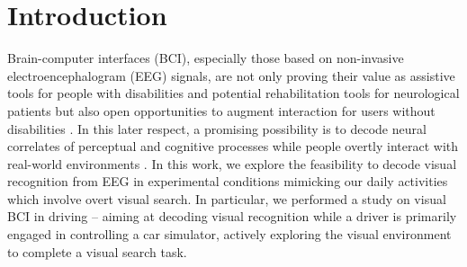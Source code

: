 \documentclass[12pt]{iopart}
\begin{document}

\section{Introduction}
\label{sec:intro}


Brain-computer interfaces (BCI), especially those based on 
non-invasive electroencephalogram (EEG) signals, are not only
proving their value as assistive tools for people 
with disabilities
\cite{birbaumer_spelling_1999,wolpaw_control_2004,holz_braincomputer_2013,leeb_towards_2015,saeedi_long-term_2017,perdikis_cybathlon_2018}
and potential rehabilitation tools for
neurological patients
\cite{ramos-murguialday_brain-machine-interface_2013,pichiorri_braincomputer_2015,biasiucci_brain-actuated_2018,cervera_braincomputer_2018}
but also open opportunities 
to augment interaction for users without disabilities \cite{zhang_eeg-based_2015,khaliliardali_action_2015,chavarriaga_decoding_2018}. In this
later respect, a promising possibility is to decode neural
correlates of perceptual and cognitive processes while people
overtly interact with real-world environments
\cite{uscumlic_iterative_2013,jangraw_neurally_2014,haufe_electrophysiology-based_2014}.
In this work, we explore the feasibility to decode visual recognition
from EEG in experimental conditions mimicking our
daily activities which involve overt visual search. In particular,
we performed a study on visual BCI in
driving -- aiming at decoding visual recognition
while a driver is primarily engaged in controlling a car simulator,
actively exploring the visual environment to complete a visual search task.
\end{document}
